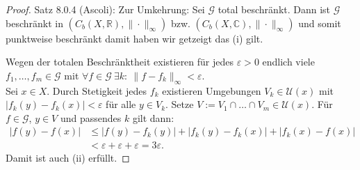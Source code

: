 \begin{proof}{Satz 8.0.4 (Ascoli):}
    \bigskip
    Zur Umkehrung: 
    Sei $\mathcal{G}$ total beschränkt. 
    Dann ist $\mathcal{G}$ beschränkt in $(C_b(X,\mathbb{R}),\|\cdot\|_\infty)$ 
    bzw. $(C_b(X,\mathbb{C}),\|\cdot\|_\infty)$ und somit punktweise beschränkt
    damit  haben wir getzeigt das (i) gilt.

    Wegen der totalen Beschränktheit existieren für jedes $\varepsilon > 0$ 
    endlich viele 
    $f_1, \dots, f_m \in \mathcal{G}$ mit 
    $\forall f \in \mathcal{G}\ \exists k:\ \|f - f_k\|_\infty < \varepsilon$.\\
    Sei $x \in X$. 
    Durch Stetigkeit jedes $f_k$ existieren Umgebungen $V_k \in \mathcal{U}(x)$ 
    mit $|f_k(y) - f_k(x)| < \varepsilon$ für alle $y \in V_k$.
    Setze $V := V_1 \cap \dots \cap V_m \in \mathcal{U}(x)$.
    Für $f \in \mathcal{G}$, $y \in V$ und passendes $k$ gilt dann:
    \begin{equation*}
    \begin{split}
        |f(y) - f(x)| 
        &\le |f(y) - f_k(y)| + |f_k(y) - f_k(x)| + |f_k(x) - f(x)| \\
        &< \varepsilon + \varepsilon + \varepsilon = 3\varepsilon.
    \end{split}
    \end{equation*}
    Damit ist auch (ii) erfüllt.
\end{proof}